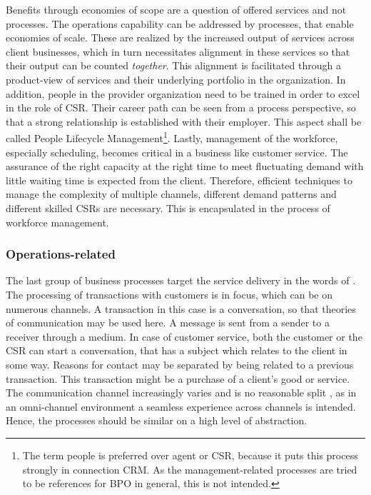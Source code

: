 	Benefits through economies of scope are a question of offered services and not processes. The operations capability can be addressed by processes, that enable economies of scale. These are realized by the increased output of services across client businesses, which in turn necessitates alignment in these services so that their output can be counted \textit{together}. This alignment is facilitated through a product-view of services and their underlying portfolio in the organization. In addition, people in the provider organization need to be trained  in order to excel in the role of \acrshort{CSR}. Their career path can be seen from a process perspective, so that a strong relationship is established with their employer. This aspect shall be called People Lifecycle Management\footnote{The term people is preferred over agent or \acrshort{CSR}, because it puts this process strongly in connection \acrshort{CRM}. As the management-related processes are tried to be references for \acrshort{BPO} in general, this is not intended.}.  Lastly, management of the workforce, especially scheduling, becomes critical in a business like customer service. The assurance of the right capacity at the right time to meet fluctuating demand with little waiting time is expected from the client. Therefore, efficient techniques to manage the complexity of multiple channels, different demand patterns and different skilled \acrshort{CSR}s are necessary. This is encapsulated in the process of workforce management. 
	
	\subsubsection{Operations-related}
	The last group of business processes target the service delivery in the words of \citeauthor{schewe2007}. The processing of transactions with customers is in focus, which can be on numerous channels. A transaction in this case is a conversation, so that theories of communication \citep{shannon1949} may be used here.  A message is sent from a sender to a receiver through a medium. In case of customer service, both the customer or the \acrshort{CSR} can start a conversation, that has a subject which relates to the client in some way. Reasons for contact may be separated by being related to a previous transaction. This transaction might be a purchase of a client's good or service. The communication channel increasingly varies and is no reasonable split , as in an omni-channel environment a seamless experience across channels is intended. Hence, the processes should be similar on a high level of abstraction. 
	
